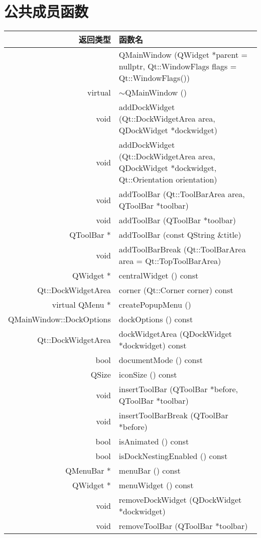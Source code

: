 \section{公共成员函数}

\begin{longtable}{|r|m{20em}|}
\hline
返回类型  & 	函数名 \\
\hline
 &QMainWindow (QWidget *parent = nullptr, Qt::WindowFlags flags = Qt::WindowFlags()) \\ 
 \hline
virtual  &	$\sim$QMainWindow () \\
\hline
void 	&addDockWidget (Qt::DockWidgetArea area, QDockWidget *dockwidget) \\ 
\hline
void 	&addDockWidget (Qt::DockWidgetArea area, QDockWidget *dockwidget, Qt::Orientation orientation) \\
\hline
void 	&addToolBar (Qt::ToolBarArea area, QToolBar *toolbar) \\ 
\hline
void 	&addToolBar (QToolBar *toolbar) \\ 
\hline
QToolBar *& 	addToolBar (const QString \&title) \\
\hline
void 	&addToolBarBreak (Qt::ToolBarArea area = Qt::TopToolBarArea) \\
\hline
QWidget *& 	centralWidget () const \\ 
\hline
Qt::DockWidgetArea &	corner (Qt::Corner corner) const \\
\hline
virtual QMenu * &	createPopupMenu () \\
\hline
QMainWindow::DockOptions& 	dockOptions () const\\
\hline
Qt::DockWidgetArea 	&dockWidgetArea (QDockWidget *dockwidget) const\\
\hline
bool &	documentMode () const \\
\hline
QSize &	iconSize () const\\
\hline
void 	&insertToolBar (QToolBar *before, QToolBar *toolbar)\\
\hline
void 	&insertToolBarBreak (QToolBar *before)\\
\hline
bool 	&isAnimated () const\\
\hline
bool 	&isDockNestingEnabled () const\\
\hline
QMenuBar *& 	menuBar () const \\ 
\hline
QWidget * &	menuWidget () const \\ 
\hline
void 	&removeDockWidget (QDockWidget *dockwidget)\\ 
\hline
void 	&removeToolBar (QToolBar *toolbar) \\ 

\end{longtable}
